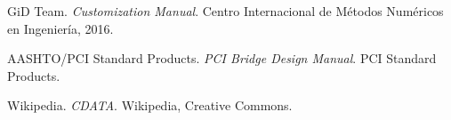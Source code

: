 \documentclass[10pt, a4paper, twocolumn]{article} %
\begin{document}

\begin{thebibliography}{1}
GiD Team. 
\textit{Customization Manual}. 
Centro Internacional de Métodos Numéricos en Ingeniería, 2016.

AASHTO/PCI Standard Products. 
\textit{PCI Bridge Design Manual}. 
PCI Standard Products.

Wikipedia.
\textit{CDATA}.
Wikipedia, Creative Commons.



\end{thebibliography}


\end{document}
